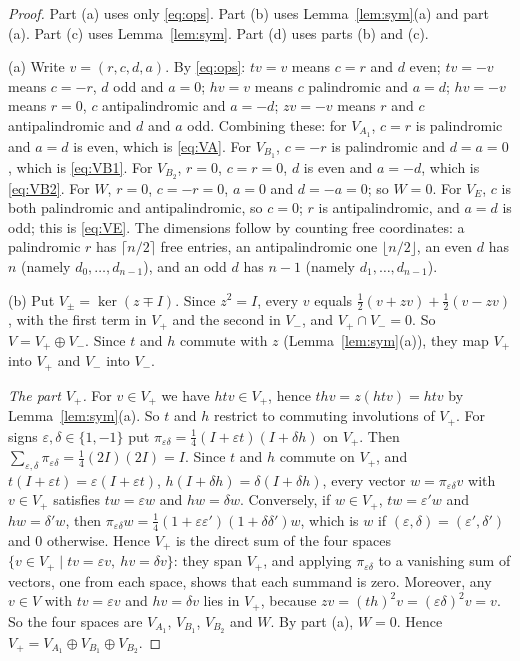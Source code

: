 \documentclass[11pt]{amsart}
\theoremstyle{plain}
\theoremstyle{definition}
\theoremstyle{remark}
\numberwithin{equation}{section}
\newcommand{\VA}{V_{A_1}}
\newcommand{\VBa}{V_{B_1}}
\newcommand{\VBb}{V_{B_2}}
\newcommand{\VE}{V_{E}}
\begin{document}
\begin{proof}
Part (a) uses only \eqref{eq:ops}. Part (b) uses Lemma~\ref{lem:sym}(a) and part (a).
Part (c) uses Lemma~\ref{lem:sym}. Part (d) uses parts (b) and (c).

(a) Write \(v=(r,c,d,a)\). By \eqref{eq:ops}:
\(tv=v\) means \(c=r\) and \(d\) even;
\(tv=-v\) means \(c=-r\), \(d\) odd and \(a=0\);
\(hv=v\) means \(c\) palindromic and \(a=d\);
\(hv=-v\) means \(r=0\), \(c\) antipalindromic and \(a=-d\);
\(zv=-v\) means \(r\) and \(c\) antipalindromic and \(d\) and \(a\) odd.
Combining these: for \(\VA\), \(c=r\) is palindromic and \(a=d\) is even, which is
\eqref{eq:VA}. For \(\VBa\), \(c=-r\) is palindromic and \(d=a=0\), which is
\eqref{eq:VB1}. For \(\VBb\), \(r=0\), \(c=r=0\), \(d\) is even and \(a=-d\), which is
\eqref{eq:VB2}. For \(W\), \(r=0\), \(c=-r=0\), \(a=0\) and \(d=-a=0\); so \(W=0\). For
\(\VE\), \(c\) is both palindromic and antipalindromic, so \(c=0\); \(r\) is
antipalindromic, and \(a=d\) is odd; this is \eqref{eq:VE}. The dimensions follow by
counting free coordinates: a palindromic \(r\) has \(\lceil n/2\rceil\) free entries, an
antipalindromic one \(\lfloor n/2\rfloor\), an even \(d\) has \(n\) (namely
\(d_0,\dots,d_{n-1}\)), and an odd \(d\) has \(n-1\) (namely \(d_1,\dots,d_{n-1}\)).

(b) Put \(V_{\pm}=\ker(z\mp I)\). Since \(z^2=I\), every \(v\) equals
\(\frac12(v+zv)+\frac12(v-zv)\), with the first term in \(V_+\) and the second in
\(V_-\), and \(V_+\cap V_-=0\). So \(V=V_+\oplus V_-\). Since \(t\) and \(h\) commute with
\(z\) (Lemma~\ref{lem:sym}(a)), they map \(V_+\) into \(V_+\) and \(V_-\) into \(V_-\).

\emph{The part \(V_+\).} For \(v\in V_+\) we have \(htv\in V_+\), hence
\(thv=z(htv)=htv\) by Lemma~\ref{lem:sym}(a). So \(t\) and \(h\) restrict to commuting
involutions of \(V_+\). For signs \(\varepsilon,\delta\in\{1,-1\}\) put
\(\pi_{\varepsilon\delta}=\frac14(I+\varepsilon t)(I+\delta h)\) on \(V_+\). Then
\(\sum_{\varepsilon,\delta}\pi_{\varepsilon\delta}=\frac14(2I)(2I)=I\). Since \(t\) and
\(h\) commute on \(V_+\), and \(t(I+\varepsilon t)=\varepsilon(I+\varepsilon t)\),
\(h(I+\delta h)=\delta(I+\delta h)\), every vector \(w=\pi_{\varepsilon\delta}v\) with
\(v\in V_+\) satisfies \(tw=\varepsilon w\) and \(hw=\delta w\). Conversely, if
\(w\in V_+\), \(tw=\varepsilon'w\) and \(hw=\delta'w\), then
\(\pi_{\varepsilon\delta}w=\frac14(1+\varepsilon\varepsilon')(1+\delta\delta')w\), which
is \(w\) if \((\varepsilon,\delta)=(\varepsilon',\delta')\) and \(0\) otherwise. Hence
\(V_+\) is the direct sum of the four spaces
\(\{v\in V_+\mid tv=\varepsilon v,\ hv=\delta v\}\): they span \(V_+\), and applying
\(\pi_{\varepsilon\delta}\) to a vanishing sum of vectors, one from each space, shows
that each summand is zero. Moreover, any \(v\in V\) with \(tv=\varepsilon v\) and
\(hv=\delta v\) lies in \(V_+\), because \(zv=(th)^2v=(\varepsilon\delta)^2v=v\). So the
four spaces are \(\VA\), \(\VBa\), \(\VBb\) and \(W\). By part (a), \(W=0\). Hence
\(V_+=\VA\oplus\VBa\oplus\VBb\).


\end{proof}
\end{document}
